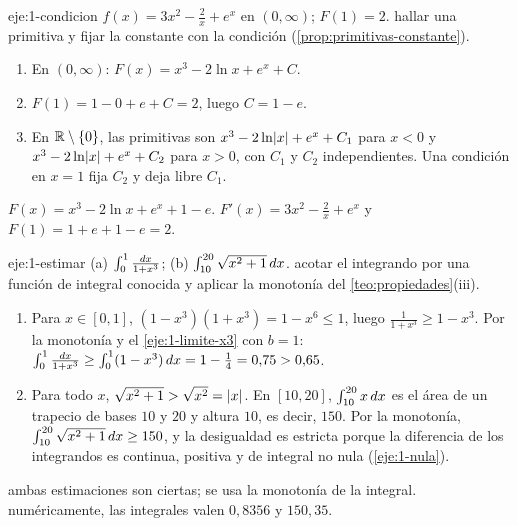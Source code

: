\begin{solucion}{eje:1-condicion}
\datos $f(x)=3x^{2}-\frac2x+e^{x}$ en $(0,\infty)$; $F(1)=2$.
\planteamiento hallar una primitiva y fijar la constante con la condición (\cref{prop:primitivas-constante}).
\pasos
\begin{enumerate}[label=\arabic*.]
  \item En $(0,\infty)$: $F(x)=x^{3}-2\ln x+e^{x}+C$.
  \item $F(1)=1-0+e+C=2$, luego $C=1-e$.
  \item En $\mathbb{R}\setminus\{0\}$, las primitivas son $x^{3}-2\ln\lvert x\rvert+e^{x}+C_1$ para $x<0$ y $x^{3}-2\ln\lvert x\rvert+e^{x}+C_2$ para $x>0$, con $C_1$ y $C_2$ independientes. Una condición en $x=1$ fija $C_2$ y deja libre $C_1$.
\end{enumerate}
\resultado $F(x)=x^{3}-2\ln x+e^{x}+1-e$.
\comprobacion $F'(x)=3x^{2}-\frac2x+e^{x}$ y $F(1)=1+e+1-e=2$.
\end{solucion}

\begin{solucion}{eje:1-estimar}
\datos (a) $\int_0^{1}\frac{\mathop{}\!d x}{1+x^{3}}$; (b) $\int_{10}^{20}\sqrt{x^{2}+1}\mathop{}\!d x$.
\planteamiento acotar el integrando por una función de integral conocida y aplicar la monotonía del \cref{teo:propiedades}(iii).
\pasos
\begin{enumerate}[label=(\alph*)]
  \item Para $x\in[0,1]$, $(1-x^{3})(1+x^{3})=1-x^{6}\le1$, luego $\frac{1}{1+x^{3}}\ge1-x^{3}$. Por la monotonía y el \cref{eje:1-limite-x3} con $b=1$: $\int_0^{1}\frac{\mathop{}\!d x}{1+x^{3}}\ge\int_0^{1}(1-x^{3})\mathop{}\!d x=1-\frac14=0{,}75>0{,}65$.
  \item Para todo $x$, $\sqrt{x^{2}+1}>\sqrt{x^{2}}=\lvert x\rvert$. En $[10,20]$, $\int_{10}^{20}x\mathop{}\!d x$ es el área de un trapecio de bases $10$ y $20$ y altura $10$, es decir, $150$. Por la monotonía, $\int_{10}^{20}\sqrt{x^{2}+1}\mathop{}\!d x\ge150$, y la desigualdad es estricta porque la diferencia de los integrandos es continua, positiva y de integral no nula (\cref{eje:1-nula}).
\end{enumerate}
\resultado ambas estimaciones son ciertas; se usa la monotonía de la integral.
\comprobacion numéricamente, las integrales valen $0{,}8356$ y $150{,}35$.
\end{solucion}

